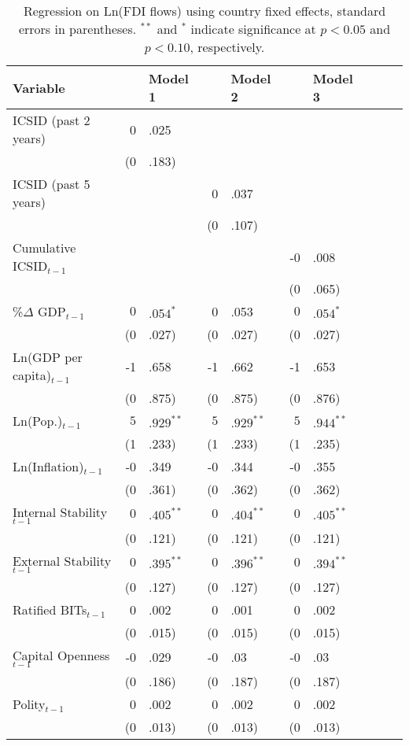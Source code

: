 \documentclass[12pt,onesided]{amsart}
\begin{document}
\begin{table}[ht]
\centering
\caption{Regression on Ln(FDI flows) using country fixed effects, standard errors in parentheses. $^{**}$ and $^{*}$ indicate significance at $p< 0.05 $ and $p< 0.10 $, respectively.} 
\label{tab:dispFDI}
{\footnotesize
\begin{tabular}{lr@{} lr@{}lr@{}lr@{}lr@{}}
 Variable && Model 1 && Model 2 && Model 3 \\ 
  \hline
\hline
ICSID  (past 2 years) & 0&.025 &&  &&  \\ 
   & (0&.183) &&  &&  \\ 
  ICSID  (past 5 years) &&  & 0&.037 &&  \\ 
   &&  & (0&.107) &&  \\ 
  Cumulative ICSID$_{t-1}$ &&  &&  & -0&.008 \\ 
   &&  &&  & (0&.065) \\ 
  \%$\Delta$ GDP$_{t-1}$ & $0$&$.054^{\ast}$ & 0&.053 & $0$&$.054^{\ast}$ \\ 
   & (0&.027) & (0&.027) & (0&.027) \\ 
  Ln(GDP per capita)$_{t-1}$ & -1&.658 & -1&.662 & -1&.653 \\ 
   & (0&.875) & (0&.875) & (0&.876) \\ 
  Ln(Pop.)$_{t-1}$ & $5$&$.929^{\ast\ast}$ & $5$&$.929^{\ast\ast}$ & $5$&$.944^{\ast\ast}$ \\ 
   & (1&.233) & (1&.233) & (1&.235) \\ 
  Ln(Inflation)$_{t-1}$ & -0&.349 & -0&.344 & -0&.355 \\ 
   & (0&.361) & (0&.362) & (0&.362) \\ 
  Internal Stability$_{t-1}$ & $0$&$.405^{\ast\ast}$ & $0$&$.404^{\ast\ast}$ & $0$&$.405^{\ast\ast}$ \\ 
   & (0&.121) & (0&.121) & (0&.121) \\ 
  External Stability$_{t-1}$ & $0$&$.395^{\ast\ast}$ & $0$&$.396^{\ast\ast}$ & $0$&$.394^{\ast\ast}$ \\ 
   & (0&.127) & (0&.127) & (0&.127) \\ 
  Ratified BITs$_{t-1}$ & 0&.002 & 0&.001 & 0&.002 \\ 
   & (0&.015) & (0&.015) & (0&.015) \\ 
  Capital Openness$_{t-1}$ & -0&.029 & -0&.03 & -0&.03 \\ 
   & (0&.186) & (0&.187) & (0&.187) \\ 
  Polity$_{t-1}$ & 0&.002 & 0&.002 & 0&.002 \\ 
   & (0&.013) & (0&.013) & (0&.013) \\ 

\end{tabular}}
\end{table}
\end{document}
